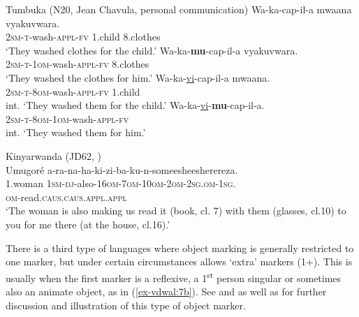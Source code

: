 \documentclass[output=paper
,modfonts
,nonflat]{langsci/langscibook}
\begin{document}
\begin{exe}
\ex Tumbuka (N20, Jean Chavula, personal communication) \label{ex-vdwal:4} 
	\xlist
	\ex
		\gll  Wa-ka-cap-il-a mwaana vyakuvwara.\\
		\textsc{2sm-t}-wash-\textsc{appl}-\textsc{fv} 1.child 8.clothes \\
		\glt `They washed clothes for the child.'
	\ex 	
		\gll Wa-ka-\textbf{mu}-cap-il-a vyakuvwara.\\
		\textsc{2sm-t-1om}-wash-\textsc{appl}-\textsc{fv} 8.clothes \\
		\glt `They washed the clothes for him.'
	\ex 
		\gll *Wa-ka-\underline{vi}-cap-il-a mwaana.\\
		\textsc{2sm-t-8om}-wash-\textsc{appl}-\textsc{fv} 1.child \\
		\glt int. `They washed them for the child.'
	\ex 
		\gll *Wa-ka-\underline{vi}-\textbf{mu}-cap-il-a.\\
		\textsc{2sm-t-8om}-\textsc{1om}-wash-\textsc{appl-fv} \\
		\glt int. `They washed them for him.'
	\endxlist
\end{exe}
\begin{exe}
\ex Kinyarwanda (JD62, \citealt[183]{Beaudoin-Lietz_et_al2004})\label{ex-vdwal:6}\\
	\gll Umugoré a-ra-na-ha-ki-zi-ba-ku-n-someesheesherereza.\\
	1.woman{} \textsc{1sm}-\textsc{dj}-also-\textsc{16om}-\textsc{7om}-\textsc{10om}-\textsc{2om}-\textsc{2sg}.\textsc{om}-\textsc{1sg}.\\ \textsc{om}-read.\textsc{caus}.\textsc{caus}.\textsc{appl}.\textsc{appl}\\
	\glt `The woman is also making us read it (book, cl. 7) with them (glasses, cl.10) to you for me there (at the house, cl.16).'
\end{exe}
There is a third type of languages where object marking is generally restricted to one marker, but under certain circumstances allows ‘extra’ markers (1+). This is usually when the first marker is a reflexive, a 1\textsuperscript{st} person singular or sometimes also an animate object, as in (\ref{ex-vdwal:7b}). See \citet{Polak1986} and \citet{Marlo2014, Marlo2015} as well as \citet{Sikuku2012} for further discussion and illustration of this type of object marker.
\end{document}
